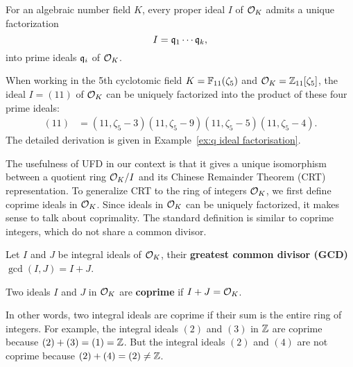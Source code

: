 \documentclass[../main.tex]{subfiles}
\begin{document}
\begin{theorem}
\label{thm:idealsOKUFD}
\reversemarginpar
{}
For an algebraic number field $K$, every proper ideal $I$ of $\mathcal{O}_K$ admits a unique factorization
\begin{equation}\label{eq:ideal unique factorization}
    I = \mathfrak{q}_1 \cdots \mathfrak{q}_k,
\end{equation}
into prime ideals $\mathfrak{q}_i$ of $\mathcal{O}_K$. 
\end{theorem}

\begin{example}
When working in the 5th cyclotomic field $K=\mathbb{F}_{11}(\zeta_5)$ and $\mathcal{O}_K=\mathbb{Z}_{11}[\zeta_5]$, the ideal $I=(11)$ of $\mathcal{O}_K$ can be uniquely factorized into the product of these four prime ideals:
\begin{align*}
    (11)&=(11,\zeta_5-3)(11,\zeta_5-9)(11,\zeta_5-5)(11,\zeta_5-4).
\end{align*}
The detailed derivation is given in Example~\ref{ex:q ideal factorisation}.
\end{example}

The usefulness of UFD in our context is that it gives a unique isomorphism between a quotient ring $\mathcal{O}_K/I$ and its Chinese Remainder Theorem (CRT) representation. 
To generalize CRT to the ring of integers $\mathcal{O}_K$, we first define coprime ideals in $\mathcal{O}_K$. Since ideals in $\mathcal{O}_K$ can be uniquely factorized, it makes sense to talk about coprimality. The standard definition is similar to coprime integers, which do not share a common divisor.  

\begin{definition}
\reversemarginpar
{}
Let $I$ and $J$ be integral ideals of $\mathcal{O}_K$, their \textbf{greatest common divisor (GCD)} $\gcd(I, J) = I+J$. 
\end{definition}

\begin{definition}
\label{def:coprimeIdeal}
\reversemarginpar
{}
Two ideals $I$ and $J$ in $\mathcal{O}_K$ are \textbf{coprime} if $I+J=\mathcal{O}_K$.
\end{definition}
In other words, two integral ideals are coprime if their sum is the entire ring of integers.
For example, the integral ideals $(2)$ and $(3)$ in $\mathbb{Z}$ are coprime because $(2)+(3)=(1)=\mathbb{Z}$. But the integral ideals $(2)$ and $(4)$ are not coprime because $(2)+(4)=(2) \neq \mathbb{Z}$. 
\end{document}

